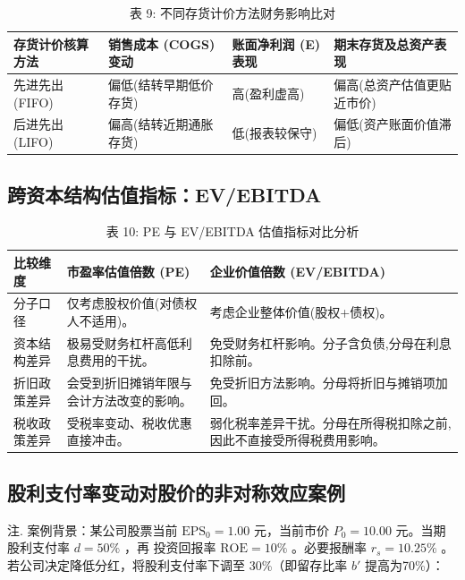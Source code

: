 \documentclass[lang=cn,10pt,color=blue]{elegantbook}
\begin{document}
\begin{table}[ht]
  \centering
  \caption{表 9: 不同存货计价方法财务影响比对}
  \renewcommand{\arraystretch}{1.4}
\begin{tabularx}{\textwidth}{llYY}
  \toprule
  存货计价核算方法 & 销售成本 (COGS) 变动 & 账面净利润 (E) 表现 & 期末存货及总资产表现 \\
  \midrule
  先进先出 (FIFO) & 偏低(结转早期低价存货) & 高(盈利虚高) & 偏高(总资产估值更贴近市价) \\
  后进先出 (LIFO) & 偏高(结转近期通胀存货) & 低(报表较保守) & 偏低(资产账面价值滞后) \\
  \bottomrule
\end{tabularx}
\end{table}

\subsection{跨资本结构估值指标：EV/EBITDA}

\begin{table}[ht]
  \centering
  \caption{表 10: PE 与 EV/EBITDA 估值指标对比分析}
  \renewcommand{\arraystretch}{1.4}
\begin{tabularx}{\textwidth}{lYY}
  \toprule
  比较维度 & 市盈率估值倍数 (PE) & 企业价值倍数 (EV/EBITDA) \\
  \midrule
  分子口径 & 仅考虑股权价值(对债权人不适用)。 & 考虑企业整体价值(股权+债权)。 \\
  资本结构差异 & 极易受财务杠杆高低利息费用的干扰。 & 免受财务杠杆影响。分子含负债,分母在利息扣除前。 \\
  折旧政策差异 & 会受到折旧摊销年限与会计方法改变的影响。 & 免受折旧方法影响。分母将折旧与摊销项加回。 \\
  税收政策差异 & 受税率变动、税收优惠直接冲击。 & 弱化税率差异干扰。分母在所得税扣除之前,因此不直接受所得税费用影响。 \\
  \bottomrule
\end{tabularx}
\end{table}

\subsection{股利支付率变动对股价的非对称效应案例}

注. 案例背景：某公司股票当前 $\mathrm{EPS}_0 = 1.00$ 元，当前市价 $P_0 = 10.00$ 元。当期股利支付率 $d = 5 0 \%$ ，再 投资回报率 $\mathrm { R O E } = 1 0 \%$ 。必要报酬率 $r _ { s } = 1 0 . 2 5 \%$ 。若公司决定降低分红，将股利支付率下调至 30\%（即留存比率 $b'$ 提高为70\%）： 
\end{document}
